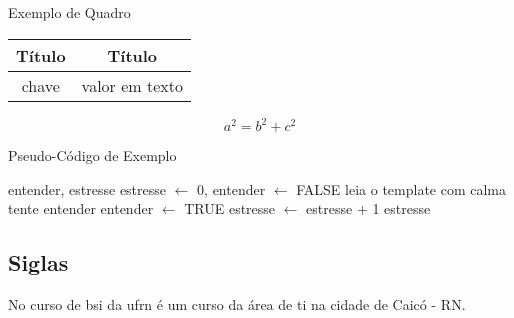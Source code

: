     
    \begin{quadro}[h]
        \centering
        \caption{Exemplo de Quadro}
        \begin{tabular}{|c|c|}
            \hline
            \textbf{Título} & \textbf{Título}  \\ \hline
            chave & valor em texto \\ \hline
        \end{tabular}
        \label{tab:quadro}
    \end{quadro}
    
    \begin{equation}
        \label{eq:equacao}
        a^2 = b^2 + c^2
    \end{equation}
    
    \begin{algorithm}[H]
        \caption{Pseudo\hyp{Código} de Exemplo}
        \label{alg:algoritmo}
        \SetAlgoLined
        \begin{algorithmic}[1]
            \REQUIRE entender, estresse
            \ENSURE estresse $\leftarrow$ 0, entender $\leftarrow$ FALSE
            \REPEAT
            	\STATE leia o template com calma
            	\STATE tente entender
                    \STATE entender $\leftarrow$ TRUE
                \ELSE
                    \STATE estresse $\leftarrow$ estresse + 1
                \ENDIF
            \RETURN estresse
        \end{algorithmic}
    \end{algorithm}
    \begin{center}
        \vspace{-2em}
    \end{center}
    
    \subsection{\textbf{Siglas}}
        \label{sec:siglas}
        
        No curso de \ac{bsi} da \ac{ufrn} é um curso da área de \ac{ti} na cidade de Caicó - RN.
\newpage
